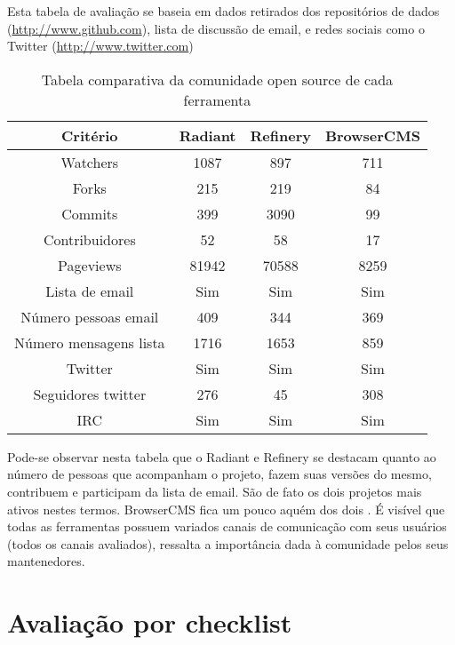 Esta tabela de avaliação se baseia em dados retirados dos repositórios de dados (\url{http://www.github.com}), lista de discussão de email, e redes sociais como o Twitter (\url{http://www.twitter.com})

\begin{table}[ht]
\caption{Tabela comparativa da comunidade open source de cada ferramenta } %
\centering %
\begin{tabular}{c c c c} %
\hline\hline %
Critério & Radiant & Refinery & BrowserCMS \\ [0.5ex] %
\hline %
Watchers               & 1087  & 897   & 711   \\ %
Forks                  & 215   & 219   & 84    \\
Commits                & 399   & 3090  & 99    \\
Contribuidores         & 52    & 58    & 17    \\ 
Pageviews              & 81942 & 70588 & 8259 \\ 
Lista de email         & Sim   & Sim   & Sim  \\ 
Número pessoas email   & 409   & 344   & 369  \\ 
Número mensagens lista & 1716  & 1653  & 859  \\ 
Twitter                & Sim   & Sim   & Sim  \\ 
Seguidores twitter     & 276   & 45    & 308  \\ 
IRC                    & Sim   & Sim   & Sim  \\ [1ex] %
\hline %
\end{tabular}
\label{table:nonlin} %
\end{table}

Pode-se observar nesta tabela que o Radiant e Refinery se destacam quanto ao número de pessoas que acompanham o projeto, fazem suas versões do mesmo, contribuem e participam da lista de email. São de fato os dois projetos mais ativos nestes termos. BrowserCMS fica um pouco aquém dos dois . É visível que todas as ferramentas possuem variados canais de comunicação com seus usuários (todos os canais avaliados), ressalta a importância dada à comunidade pelos seus mantenedores.

\section{Avaliação por checklist}

